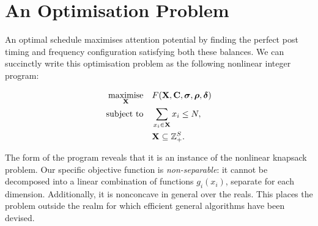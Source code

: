 \documentclass[onesided,letterpaper]{tufte-book}
\begin{document}
\newpage

\section{An Optimisation Problem}

An optimal schedule maximises attention potential by finding the perfect post timing and frequency configuration satisfying both these balances. We can succinctly write this optimisation problem as the following nonlinear integer program:

\begin{equation}
  \begin{aligned}
    \underset{\mathbf{X}\quad}{\text{maximise\quad}}& F(\mathbf{X}, \mathbf{C}, \boldsymbol\sigma, \boldsymbol\rho, \boldsymbol\delta)\\
    \text{subject to\quad}& \sum_{x_i \in \mathbf{X}} x_i \leq N, \\
                          & \mathbf{X} \subseteq \mathbb{Z}^S_+.\\
  \end{aligned}
\end{equation}

The form of the program reveals that it is an instance of the nonlinear knapsack problem\cite{bretthauer2002nonlinear}. Our specific objective function is \textit{non-separable}: it cannot be decomposed into a linear combination of functions $g_i(x_i)$, separate for each dimension. Additionally, it is nonconcave in general over the reals. This places the problem outside the realm for which efficient general algorithms have been devised.
\end{document}
